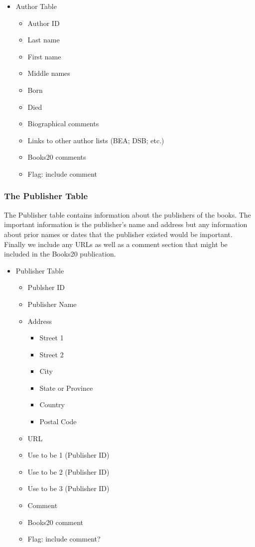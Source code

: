 \documentclass{article}%
\begin{document}
\begin{itemize}
\item Author Table
  \begin{itemize}
  \item Author ID
  \item Last name
  \item First name
  \item Middle names
  \item Born
  \item Died
  \item Biographical comments
  \item Links to other author lists (BEA; DSB; etc.)
  \item Books20 comments
  \item Flag: include comment
  \end{itemize}
\end{itemize}

\subsubsection{The Publisher Table}

The Publisher table contains information about the publishers of the
books.  The important information is the publisher's name and address
but any information about prior names or dates that the publisher
existed would be important. Finally we include any URLs as well as a
comment section that might be included in the Books20 publication.\

\begin{itemize}
\item Publisher Table
  \begin{itemize}
  \item Publsher ID
  \item Publisher Name
  \item Address
    \begin{itemize}
    \item Street 1
    \item Street 2
    \item City
    \item State or Province
    \item Country
    \item Postal Code
    \end{itemize}
  \item URL
  \item Use to be 1 (Publisher ID)
  \item Use to be 2 (Publisher ID)
  \item Use to be 3 (Publisher ID)
  \item Comment
  \item Books20 comment
  \item Flag: include comment?
  \end{itemize}
\end{itemize}
\end{document}

